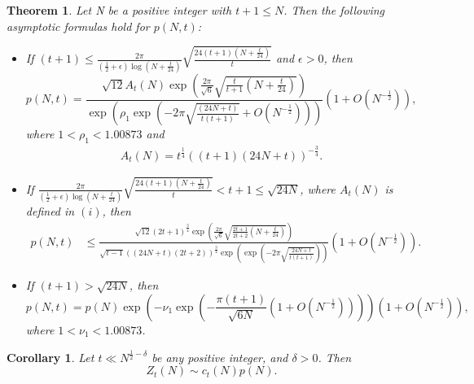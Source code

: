 \documentclass[10pt,a4paper]{amsart}
\newtheorem{theorem}{Theorem}
\newtheorem{corollary}{Corollary}
\begin{document}
	\begin{theorem}\label{theorem-1.2}
		Let N be a positive integer with $t+1\le N$. Then the following asymptotic formulas hold for $p(N,t)$:
		\begin{itemize}
			\item[\hypertarget{thm1.2i}{$(i)$}] If $(t + 1)\le \frac{2\pi}{(\frac{1}{2}+\epsilon)\log \left(N+\frac{t}{24}\right)}\sqrt{\frac{24(t+1)\left(N+\frac{t}{24}\right)}{t}} $ and $\epsilon>0$, then 
			\begin{equation*}
				p(N,t) =\frac{\sqrt{12}A_{t}(N)\exp\left(\frac{2\pi}{\sqrt{6}}\sqrt{\frac{t}{t+1}\left(N+\frac{t}{24}\right)}\right)}{\exp\left(\rho_1\exp\left(-2\pi\sqrt{\frac{(24N+t)}{t(t+1)}}+O\left(N^{-\frac{1}{2}}\right)\right)\right)}\left(1+O\left(N^{-\frac{1}{2}}\right)\right),
			\end{equation*}
			where $1 < \rho_{1} < 1.00873$ and 
			\begin{align*}
				A_{t}(N)=t^{\frac{1}{4}} \left((t+1)(24N+t)\right)^{-\frac{3}{4}}.
			\end{align*}
			\item[\hypertarget{thm1.2ii}{($ii$)}]
			If $\frac{2\pi}{(\frac{1}{2}+\epsilon)\log \left(N+\frac{t}{24}\right)}\sqrt{\frac{24(t+1)\left(N+\frac{t}{24}\right)}{t}}<t+1\le\sqrt{24N}$, where $A_t(N)$ is defined in $(i)$, then
			\begin{align*}
				p(N,t)&\le \frac{\sqrt{12}(2t+1)^{\frac{3}{4}}\exp\left(\frac{2\pi}{\sqrt{6}}\sqrt{\frac{2t+1}{2t+2}\left(N+\frac{t}{24}\right)}\right)}{\sqrt{t-1}\left((24N+t)(2t+2)\right)^{\frac{3}{4}}\exp\left(\exp\left(-2\pi\sqrt{\frac{24N+t}{t(t+1)}}\right)\right)}\left(1+O\left(N^{-\frac{1}{2}}\right)\right). 
			\end{align*}
			\item[\hypertarget{thm1.2iii}{($iii$)}] If $(t + 1) > \sqrt{24N}$, then 
			\begin{equation*}
				p(N,t)=p(N)\exp\left(-\nu_1\exp\left(-\frac{\pi (t+1)}{\sqrt{6N}}\left(1+O\left(N^{-\frac{1}{2}}\right)\right)\right)\right)\left(1+O\left(N^{-\frac{1}{2}}\right)\right),
			\end{equation*}
			where $1 < \nu_{1} < 1.00873$. %
		\end{itemize}
	\end{theorem}

	\begin{corollary}
		Let $t\ll N^{\frac{1}{2}-\delta}$ be any positive integer, and $\delta>0$. Then
		\begin{equation*}
			Z_{t}(N)\sim c_{t}(N)p(N).   
		\end{equation*}
	\end{corollary}
\end{document}
